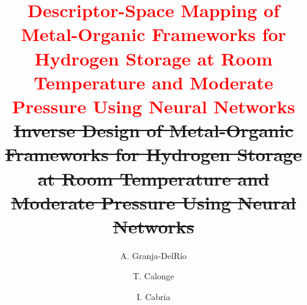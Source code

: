 \documentclass[review]{elsarticle}
\begin{document}

\begin{frontmatter}

\title{\textcolor{red}{Descriptor-Space Mapping of Metal-Organic Frameworks for 
Hydrogen Storage at Room Temperature and Moderate Pressure Using Neural 
Networks} \sout{Inverse Design of Metal-Organic Frameworks for Hydrogen Storage 
at Room Temperature and Moderate Pressure Using Neural Networks}}
\date{}
\author[1]{A. Granja-DelRío }
\author[2]{T. Calonge}
\author[1]{I. Cabria}
\address[1]{Departamento de F\'{\i}sica Te\'orica, At\'omica
y \'Optica, Universidad de Valladolid, ES-47011 Valladolid, Spain}
\address[2]{Departamento de Informática (ATC, CCIA y LSI),
Universidad de Valladolid, ES-47011 Valladolid, Spain}




\end{frontmatter}
\end{document}
